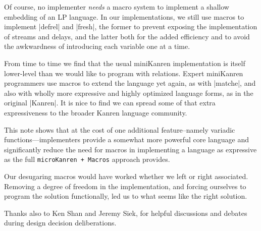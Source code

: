 \documentclass[sigplan,screen,draft,anonymous,review,natbib=false]{acmart}
\begin{document}
Of course, no implementer \emph{needs} a macro system to implement a
shallow embedding of an LP language. In our implementations, we still
use macros to implement \rackinline|defrel| and \rackinline|fresh|,
the former to prevent exposing the implementation of streams and
delays, and the latter both for the added efficiency and to avoid the
awkwardness of introducing each variable one at a time.

From time to time we find that the usual miniKanren implementation is
itself lower-level than we would like to program with relations.
Expert miniKanren programmers use macros to extend the language yet
again, as with \rackinline|matche|, and also with wholly more
expressive and highly optimized language forms, as in the original
\rackinline|Kanren|. It is nice to find we can spread some of that
extra expressiveness to the broader Kanren language community.

This note shows that at the cost of one additional feature--namely
variadic functions---implementers provide a somewhat more powerful
core language and significantly reduce the need for macros in
implementing a language as expressive as the full
\verb|microKanren + Macros| approach provides.

Our desugaring macros would have worked whether we left or right
associated. Removing a degree of freedom in the implementation, and
forcing ourselves to program the solution functionally, led us to what
seems like the right solution.

\begin{acks}

Thanks also to Ken Shan and Jeremy Siek, for helpful discussions and
debates during design decision deliberations.

\end{acks}

\printbibliography{}
\end{document}
